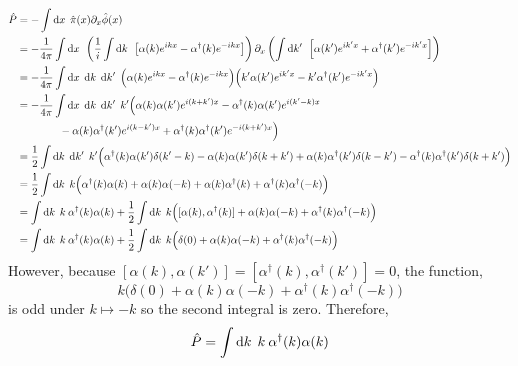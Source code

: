 \documentclass[12pt]{extarticle}
\begin{document}
\begin{align*}
\hat{P} & = - \int \mathrm{d}x \: \: \hat{\pi}(x) \partial_x \hat{\phi}(x) 
\\
& = - \frac{1}{4 \pi} \int \mathrm{d}x \: \: \left( \frac{1}{i} \int \mathrm{d}k \: \: \left[ \alpha(k) e^{i k x} - \alpha^\dagger(k) e^{- i k x} \right] \right) \partial_x \left( \int \mathrm{d}k' \: \: \left[ \alpha(k') e^{i k' x} + \alpha^\dagger(k') e^{- i k' x} \right] \right)
\\
& = -\frac{1}{4 \pi} \int \mathrm{d}x \: \: \mathrm{d}k \: \: \mathrm{d}k' \: \: \Big( \alpha(k) e^{i k x} - \alpha^\dagger(k) e^{- i k x} \Big)  \Big( k' \alpha(k') e^{i k' x} - k' \alpha^\dagger(k') e^{- i k' x} \Big)
\\
& = -\frac{1}{4 \pi} \int \mathrm{d}x \: \: \mathrm{d}k \: \: \mathrm{d}k' \: \: k' \Big( \alpha(k) \alpha(k') e^{i (k + k') x} - \alpha^\dagger(k) \alpha(k') e^{i (k' - k) x} \\
& \quad \quad \quad \quad - \alpha(k) \alpha^\dagger(k') e^{i (k - k') x} + \alpha^\dagger(k) \alpha^\dagger(k') e^{-i(k + k')x} \Big)
\\
& = \frac{1}{2}\int \mathrm{d}k \: \: \mathrm{d}k' \: \: k' \Big( \alpha^\dagger(k) \alpha(k') \delta(k' - k) - \alpha(k) \alpha(k') \delta(k + k') + \alpha(k) \alpha^\dagger(k') \delta(k - k') - \alpha^\dagger(k) \alpha^\dagger(k') \delta(k + k') \Big) 
\\
& = \frac{1}{2} \int \mathrm{d}k \: \: k \Big( \alpha^\dagger(k) \alpha(k) + \alpha(k) \alpha(-k) + \alpha(k) \alpha^\dagger(k) + \alpha^\dagger(k) \alpha^\dagger(-k) \Big) 
\\
& = \int \mathrm{d}k \: \: k \: \alpha^\dagger(k) \alpha(k) + \frac{1}{2} \int \mathrm{d}k \: \: k \Big( [\alpha(k), \alpha^\dagger(k)] + \alpha(k) \alpha(-k) + \alpha^\dagger(k) \alpha^\dagger(-k) \Big) 
\\
& = \int \mathrm{d}k \: \: k \: \alpha^\dagger(k) \alpha(k) + \frac{1}{2} \int \mathrm{d}k \: \: k \Big( \delta(0) + \alpha(k) \alpha(-k) + \alpha^\dagger(k) \alpha^\dagger(-k) \Big) 
\end{align*}
However, because $[\alpha(k), \alpha(k')] = [\alpha^\dagger(k), \alpha^\dagger(k')] = 0$, the function,
\[  k \Big( \delta(0) + \alpha(k) \alpha(-k) + \alpha^\dagger(k) \alpha^\dagger(-k) \Big) \]
is odd under $k \mapsto -k$ so the second integral is zero. Therefore,
\[ \hat{P} = \int \mathrm{d}k \: \: k \: \alpha^\dagger(k) \alpha(k) \]
\end{document}
